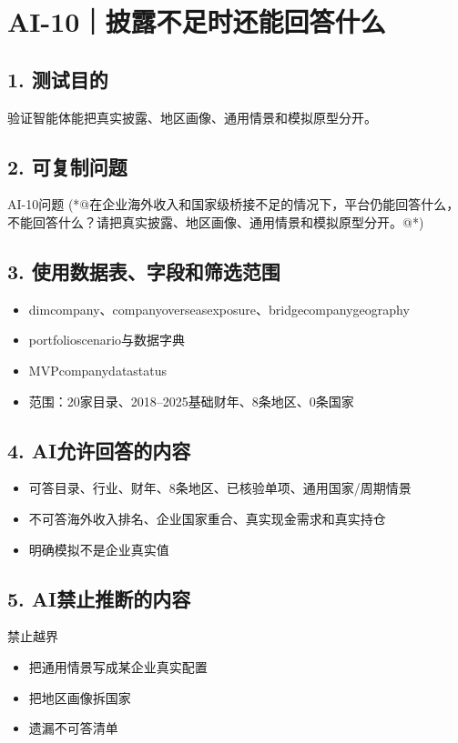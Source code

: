 \documentclass[UTF8,openany,zihao=-4]{ctexbook}
\renewcommand{\_}{\textunderscore\allowbreak}
\begin{document}
\clearpage
\section{AI-10｜披露不足时还能回答什么}
\subsection*{1. 测试目的}
验证智能体能把真实披露、地区画像、通用情景和模拟原型分开。


\subsection*{2. 可复制问题}
\begin{PromptBox}{AI-10问题}
(*@{\promptcjk 在企业海外收入和国家级桥接不足的情况下，平台仍能回答什么，不能回答什么？请把真实披露、地区画像、通用情景和模拟原型分开。}@*)
\end{PromptBox}

\subsection*{3. 使用数据表、字段和筛选范围}
\begin{itemize}
\item dim\_company、company\_overseas\_exposure、bridge\_company\_geography
\item portfolio\_scenario与数据字典
\item MVP\_company\_data\_status
\item 范围：20家目录、2018--2025基础财年、8条地区、0条国家
\end{itemize}

\subsection*{4. AI允许回答的内容}
\begin{itemize}
\item 可答目录、行业、财年、8条地区、已核验单项、通用国家/周期情景
\item 不可答海外收入排名、企业国家重合、真实现金需求和真实持仓
\item 明确模拟不是企业真实值
\end{itemize}

\subsection*{5. AI禁止推断的内容}
\begin{dangerbox}{禁止越界}
\begin{itemize}
\item 把通用情景写成某企业真实配置
\item 把地区画像拆国家
\item 遗漏不可答清单
\end{itemize}
\end{dangerbox}
\end{document}
